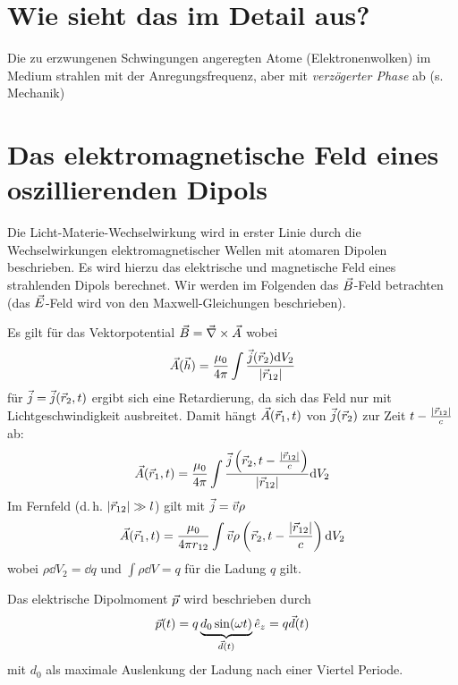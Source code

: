 \section[Detailbetrachtung]{Wie sieht das im Detail aus?}
Die zu erzwungenen Schwingungen angeregten Atome (Elektronenwolken) im
Medium strahlen mit der Anregungsfrequenz, aber mit \emph{verzögerter
  Phase} ab (s. Mechanik)

\section{Das elektromagnetische Feld eines oszillierenden Dipols}
Die Licht-Materie-Wechselwirkung wird in erster Linie durch die
Wechselwirkungen elektromagnetischer Wellen mit atomaren Dipolen
beschrieben. Es wird hierzu das elektrische und magnetische Feld eines
strahlenden Dipols berechnet.
Wir werden im Folgenden das $\vec{B}$-Feld betrachten (das $\vec{E}$-Feld
wird von den Maxwell-Gleichungen beschrieben).

Es gilt für das Vektorpotential $\vec{B}=\vec{\nabla}\times\vec{A}$ wobei
\begin{gather*}
  \vec{A} (\vec{h}) = \frac{\mu_0}{4\pi} \int 
  \frac{\vec{j}(\vec{r}_2)\mathrm{d} V_2}{|\vec{r}_{12}|}
\end{gather*}
 für $\vec{j}=\vec{j}(\vec{r}_2,t)$ ergibt sich eine
Retardierung, da sich das Feld nur mit Lichtgeschwindigkeit
ausbreitet.
Damit hängt $\vec{A}(\vec{r}_1, t)$ von $\vec{j}(\vec{r}_2)$ zur Zeit 
$t-\frac{|\vec{r}_{12}|}{c}$ ab:
\begin{gather*}
  \vec{A}(\vec{r}_1, t) = \frac{\mu_0}{4\pi} \int
  \frac
  {\vec{j}\left( \vec{r}_2, t-\frac{|\vec{r}_{12}|}{c} \right)}
  {|\vec{r}_{12}|}
  \mathrm{d} V_2
\end{gather*}
Im Fernfeld (d.\,h. $|\vec{r}_{12}|\gg l$) gilt mit $\vec{j} = \vec{v}\rho$
\begin{gather*}
  \vec{A}(\vec{r}_1, t) = \frac{\mu_0}{4\pi r_{12}} \int
  \vec{v} \rho\left( \vec{r}_2, t-\frac{|\vec{r}_{12}|}{c} \right)
  \mathrm{d} V_2
\end{gather*}
wobei $\rho \dd V_2 = \dd q$ und $\int\rho\dd V = q$ für die Ladung $q$
gilt.

Das elektrische Dipolmoment $\vec{p}$ wird beschrieben durch
\begin{gather*}
  \vec{p}(t) = q\underbrace{d_0\sin(\omega t)}_{\vec{d}(t)}\hat{e}_z
  = q\vec{d}(t)
\end{gather*}
mit $d_0$ als maximale Auslenkung der Ladung nach einer Viertel
Periode.

